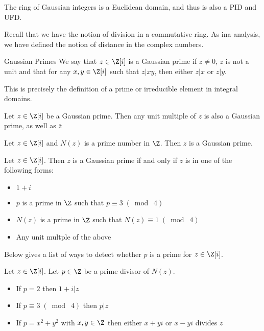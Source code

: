 \begin{prp}{}{} The ring of Gaussian integers is a Euclidean domain, and thus is also a PID and UFD. 
\end{prp}

Recall that we have the notion of division in a commutative ring. As ina analysis, we have defined the notion of distance in the complex numbers. 

\begin{defn}{Gaussian Primes}{} We say that $z\in\Z[i]$ is a Gaussian prime if $z\neq 0$, $z$ is not a unit and that for any $x,y\in\Z[i]$ such that $z|xy$, then either $z|x$ or $z|y$. 
\end{defn}

This is precisely the definition of a prime or irreducible element in integral domains. 

\begin{prp}{}{} Let $z\in\Z[i]$ be a Gaussian prime. Then any unit multiple of $z$ is also a Gaussian prime, as well as $\overline{z}$
\end{prp}

\begin{lmm}{}{} Let $z\in\Z[i]$ and $N(z)$ is a prime number in $\Z$. Then $z$ is a Gaussian prime. 
\end{lmm}

\begin{thm}{}{} Let $z\in\Z[i]$. Then $z$ is a Gaussian prime if and only if $z$ is in one of the following forms: 
\begin{itemize}
\item $1+i$
\item $p$ is a prime in $\Z$ such that $p\equiv 3\;(\bmod\;4)$
\item $N(z)$ is a prime in $\Z$ such that $N(z)\equiv 1\;(\bmod\;4)$
\item Any unit multple of the above
\end{itemize}
\end{thm}

Below gives a list of ways to detect whether $p$ is a prime for $z\in\Z[i]$. 

\begin{prp}{}{} Let $z\in\Z[i]$. Let $p\in\Z$ be a prime divisor of $N(z)$. 
\begin{itemize}
\item If $p=2$ then $1+i|z$
\item If $p\equiv 3\;(\bmod\;4)$ then $p|z$
\item If $p=x^2+y^2$ with $x,y\in\Z$ then either $x+yi$ or $x-yi$ divides $z$
\end{itemize}
\end{prp}

